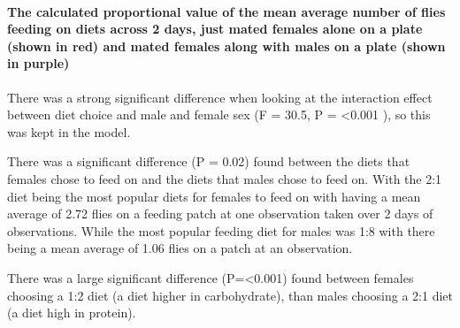 \documentclass[
]{article}
\begin{document}
\hypertarget{the-calculated-proportional-value-of-the-mean-average-number-of-flies-feeding-on-diets-across-2-days-just-mated-females-alone-on-a-plate-shown-in-red-and-mated-females-along-with-males-on-a-plate-shown-in-purple}{%
\paragraph{The calculated proportional value of the mean average number
of flies feeding on diets across 2 days, just mated females alone on a
plate (shown in red) and mated females along with males on a plate
(shown in
purple)}\label{the-calculated-proportional-value-of-the-mean-average-number-of-flies-feeding-on-diets-across-2-days-just-mated-females-alone-on-a-plate-shown-in-red-and-mated-females-along-with-males-on-a-plate-shown-in-purple}}

There was a strong significant difference when looking at the
interaction effect between diet choice and male and female sex (F =
30.5, P = \textless0.001 ), so this was kept in the model.

There was a significant difference (P = 0.02) found between the diets
that females chose to feed on and the diets that males chose to feed on.
With the 2:1 diet being the most popular diets for females to feed on
with having a mean average of 2.72 flies on a feeding patch at one
observation taken over 2 days of observations. While the most popular
feeding diet for males was 1:8 with there being a mean average of 1.06
flies on a patch at an observation.

There was a large significant difference (P=\textless0.001) found
between females choosing a 1:2 diet (a diet higher in carbohydrate),
than males choosing a 2:1 diet (a diet high in protein).
\end{document}
